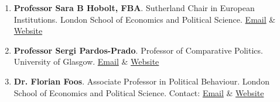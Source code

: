 \documentclass[letterpaper,11pt]{article}
\begin{document}

\begin{enumerate}
    \item \textbf{Professor Sara B Hobolt, FBA}. Sutherland Chair in European Institutions. London School of Economics and Political Science. \href{mailto:s.b.hobolt@lse.ac.uk}{\color{blue}Email} \& \href{https://hobolt.com/}{\color{blue}Website}
    \item \textbf{Professor Sergi Pardos-Prado}. Professor of Comparative Politics. University of Glasgow. \href{mailto:Sergi.Pardos-Prado@glasgow.ac.uk}{\color{blue}Email} \& \href{https://www.sergipardos.com/}{\color{blue}Website}
    \item \textbf{Dr. Florian Foos}. Associate Professor in Political Behaviour. London School of Economics and Political Science. Contact: \href{mailto:f.foos@lse.ac.uk}{\color{blue}Email} \& \href{http://www.florianfoos.net/}{\color{blue}Website}
\end{enumerate}


\end{document}
